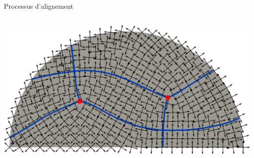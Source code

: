 \documentclass[compress,10pt,aspectratio=169]{beamer}
\begin{document}
\begin{frame}{Processus d'alignement}{}
\begin{columns}
\begin{column}{0.32\textwidth}
        \centering
        \includegraphics[scale=0.09]{images/mode_prop_stream_non_align_beam.pdf}
    \end{column}
    \end{columns}
\end{frame}
\end{document}
